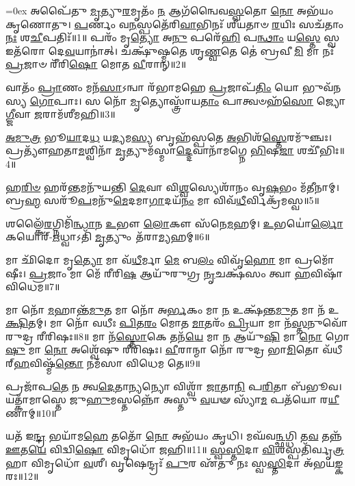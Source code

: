 \let\oldparskip\parskip
\parskip=0ex
𑌅𑌪𑍈᳴𑌤𑍁 \ul{𑌮𑍃}\-𑌤𑍍𑌯𑍁\-\ul{𑌰}\-𑌮𑍃𑌤𑌂᳴ \ul{𑌨} 𑌆𑌗᳴𑌨𑍍𑌵𑍈𑌵\-\ul{𑌸𑍍𑌵}\-𑌤𑍋 \ul{𑌨𑍋} 𑌅𑌭᳴𑌯𑌂 𑌕𑍃𑌣𑍋𑌤𑍁।
\-\ul{𑌪}\-𑌰𑍍𑌣𑌂 𑌵\-\ul{𑌨}\-𑌸𑍍𑌪𑌤𑍇᳴𑌰𑌿\-\ul{𑌵𑌾}\-𑌭𑌿𑌨𑌃᳴ 𑌶𑍀𑌯𑌤𑌾𑍞 \ul{𑌰}\-𑌯𑌿𑌃 𑌸𑌚᳴𑌤𑌾𑌂 \ul{𑌨𑌃} 𑌶\-\ul{𑌚𑍀}\-𑌪𑌤𑌿𑌃᳴॥1॥
𑌪𑌰𑌂᳴ 𑌮𑍃\-\ul{𑌤𑍍𑌯𑍋} 𑌅\-\ul{𑌨𑍁} 𑌪𑌰𑍇᳴\-\ul{𑌹𑌿} 𑌪\-\ul{𑌨𑍍𑌥𑌾𑌂} 𑌯\-\ul{𑌸𑍍𑌤𑍇} 𑌸𑍍𑌵 𑌇𑌤᳴𑌰𑍋 𑌦𑍇\-\ul{𑌵}\-𑌯𑌾𑌨𑌾॑𑌤𑍍।
𑌚𑌕𑍍𑌷𑍁᳴𑌷𑍍𑌮𑌤𑍇 𑌶𑍃\-\ul{𑌣𑍍𑌵}\-𑌤𑍇 𑌤𑍇॑ 𑌬𑍍𑌰𑌵𑍀\-\ul{𑌮𑌿} 𑌮𑌾 𑌨𑌃᳴ \ul{𑌪𑍍𑌰}\-𑌜𑌾𑍞 𑌰𑍀᳴𑌰𑌿\-\ul{𑌷𑍋} 𑌮𑍋𑌤 \ul{𑌵𑍀}\-𑌰𑌾𑌨𑍍॥2॥

𑌵𑌾𑌤𑌂᳴ \ul{𑌪𑍍𑌰𑌾}\-𑌣𑌂 𑌮𑌨᳴\-\ul{𑌸𑌾}\-𑌽𑌨𑍍𑌵𑌾 𑌰᳴𑌭𑌾𑌮𑌹𑍇 \ul{𑌪𑍍𑌰}\-𑌜𑌾𑌪᳴\-\ul{𑌤𑌿𑌂} 𑌯𑍋 𑌭𑍁𑌵᳴𑌨𑌸𑍍𑌯 \ul{𑌗𑍋}\-𑌪𑌾𑌃।
𑌸 𑌨𑍋᳴ \ul{𑌮𑍃}\-𑌤𑍍𑌯𑍋𑌸𑍍𑌤𑍍𑌰𑌾᳴𑌯\-\ul{𑌤𑌾𑌂} 𑌪𑌾𑌤𑍍𑌵𑍞𑌹᳴\-\ul{𑌸𑍋} 𑌜𑍍𑌯𑍋\-\ul{𑌗𑍍𑌜𑍀}\-𑌵𑌾 \ul{𑌜}\-𑌰𑌾𑌮᳴𑌶𑍀𑌮𑌹𑌿॥3॥

\-\ul{𑌅}\-\-\ul{𑌮𑍁}\-\-\ul{𑌤𑍍𑌰} 𑌭𑍂\-\ul{𑌯𑌾}\-𑌦\-\ul{𑌧} 𑌯\-\ul{𑌦𑍍𑌯}\-𑌮\-\ul{𑌸𑍍𑌯} 𑌬𑍃𑌹᳴𑌸𑍍𑌪𑌤𑍇 \ul{𑌅}\-𑌭𑌿𑌶᳴\-\ul{𑌸𑍍𑌤𑍇}\-𑌰𑌮𑍁᳴𑌞𑍍𑌚𑌃।
𑌪𑍍𑌰𑌤𑍍𑌯𑍗᳴𑌹𑌤𑌾\-\ul{𑌮}\-𑌶𑍍𑌵𑌿𑌨𑌾᳴ \ul{𑌮𑍃}\-𑌤𑍍𑌯𑍁𑌮᳴𑌸𑍍𑌮𑌾\-\ul{𑌦𑍍𑌦𑍇}\-𑌵𑌾𑌨𑌾᳴𑌮𑌗𑍍𑌨𑍇 \ul{𑌭𑌿}\-𑌷\-\ul{𑌜𑌾} 𑌶𑌚𑍀᳴𑌭𑌿𑌃॥4॥

𑌹\-\ul{𑌰𑌿}\-\-\ul{𑍞} 𑌹𑌰᳴\-\ul{𑌨𑍍𑌤}\-𑌮𑌨𑍁᳴𑌯𑌨𑍍𑌤𑌿 \ul{𑌦𑍇}\-𑌵𑌾 𑌵𑌿\-\ul{𑌶𑍍𑌵}\-𑌸𑍍𑌯𑍇𑌶𑌾᳴𑌨𑌂 𑌵𑍃\-\ul{𑌷}\-𑌭𑌂 𑌮᳴\-\ul{𑌤𑍀}\-𑌨𑌾𑌮𑍍।
𑌬𑍍𑌰\-\ul{𑌹𑍍𑌮} 𑌸𑌰𑍂᳴\-\ul{𑌪}\-𑌮𑌨𑍁᳴\-\ul{𑌮𑍇}\-𑌦𑌮𑌾\-\ul{𑌗𑌾}\-𑌦𑌯᳴\-\ul{𑌨𑌂} 𑌮𑌾 𑌵𑌿𑌵᳴\-\ul{𑌧𑍀}\-𑌰𑍍𑌵𑌿𑌕𑍍𑌰᳴𑌮𑌸𑍍𑌵॥5॥

𑌶𑌲𑍍𑌕𑍈᳴\-\ul{𑌰}\-𑌗𑍍𑌨𑌿𑌮𑌿᳴\-\ul{𑌨𑍍𑌧𑌾}\-𑌨 \ul{𑌉}\-𑌭𑍗 \ul{𑌲𑍋}\-𑌕𑍗 𑌸᳴𑌨𑍇\-\ul{𑌮}\-𑌹𑌮𑍍।
\-\ul{𑌉}\-𑌭𑌯𑍋॑\-\ul{𑌰𑍍𑌲𑍋}\-𑌕𑌯𑍋𑌰𑍍᳴-\-\ul{𑌋}\-𑌧𑍍𑌵𑌾𑌽𑌤𑌿᳴ \ul{𑌮𑍃}\-𑌤𑍍𑌯𑍁𑌂 𑌤᳴𑌰𑌾\-\ul{𑌮𑍍𑌯}\-𑌹𑌮𑍍॥6॥

𑌮𑌾 𑌛𑌿᳴𑌦𑍋 𑌮𑍃\-\ul{𑌤𑍍𑌯𑍋} 𑌮𑌾 𑌵᳴\-\ul{𑌧𑍀}\-𑌰𑍍𑌮𑌾 \ul{𑌮𑍇} 𑌬\-\ul{𑌲𑌂} 𑌵𑌿𑌵𑍃᳴\-\ul{𑌹𑍋} 𑌮𑌾 𑌪𑍍𑌰𑌮𑍋᳴𑌷𑍀𑌃।
\-\ul{𑌪𑍍𑌰}\-𑌜𑌾𑌂 𑌮𑌾 𑌮𑍇᳴ 𑌰𑍀𑌰𑌿\-\ul{𑌷} 𑌆𑌯𑍁᳴𑌰𑍁𑌗𑍍𑌰 \ul{𑌨𑍃}\-𑌚𑌕𑍍𑌷᳴𑌸𑌂 𑌤𑍍𑌵𑌾 \ul{𑌹}\-𑌵𑌿𑌷𑌾᳴ 𑌵𑌿𑌧𑍇𑌮॥7॥

𑌮𑌾 𑌨𑍋᳴ \ul{𑌮}\-𑌹𑌾𑌨𑍍𑌤᳴\-\ul{𑌮𑍁}\-𑌤 𑌮𑌾 𑌨𑍋᳴ 𑌅\-\ul{𑌰𑍍𑌭}\-𑌕𑌂 𑌮𑌾 \ul{𑌨} 𑌉𑌕𑍍𑌷᳴𑌨𑍍𑌤\-\ul{𑌮𑍁}\-𑌤 𑌮𑌾 𑌨᳴ 𑌉\-\ul{𑌕𑍍𑌷𑌿}\-𑌤𑌮𑍍।
 𑌮𑌾 𑌨𑍋᳴ 𑌵𑌧𑍀𑌃 \ul{𑌪𑌿}\-𑌤\-\ul{𑌰𑌂} 𑌮𑍋𑌤 \ul{𑌮𑌾}\-𑌤𑌰𑌂᳴ \ul{𑌪𑍍𑌰𑌿}\-𑌯𑌾 𑌮𑌾 𑌨᳴\-\ul{𑌸𑍍𑌤}\-𑌨𑍁𑌵𑍋᳴ 𑌰𑍁𑌦𑍍𑌰 𑌰𑍀𑌰𑌿𑌷𑌃॥8॥
 𑌮𑌾 𑌨᳴\-\ul{𑌸𑍍𑌤𑍋}\-𑌕𑍇 𑌤𑌨᳴\-\ul{𑌯𑍇} 𑌮𑌾 \ul{𑌨} 𑌆𑌯𑍁᳴\-\ul{𑌷𑌿} 𑌮𑌾 \ul{𑌨𑍋} 𑌗𑍋\-\ul{𑌷𑍁} 𑌮𑌾 \ul{𑌨𑍋} 𑌅𑌶𑍍𑌵𑍇᳴𑌷𑍁 𑌰𑍀𑌰𑌿𑌷𑌃।
 \ul{𑌵𑍀}\-𑌰𑌾𑌨𑍍𑌮𑌾 𑌨𑍋᳴ 𑌰𑍁𑌦𑍍𑌰 𑌭𑌾\-\ul{𑌮𑌿}\-𑌤𑍋 𑌵᳴𑌧𑍀𑌰𑍍‌\-\ul{𑌹}\-𑌵𑌿𑌷𑍍𑌮᳴\-\ul{𑌨𑍍𑌤𑍋} 𑌨𑌮᳴𑌸𑌾 𑌵𑌿𑌧𑍇𑌮 𑌤𑍇॥9॥

𑌪𑍍𑌰𑌜𑌾᳴𑌪\-\ul{𑌤𑍇} 𑌨 𑌤𑍍𑌵\-\ul{𑌦𑍇}\-𑌤𑌾\-\ul{𑌨𑍍𑌯}\-𑌨𑍍𑌯𑍋 𑌵𑌿𑌶𑍍𑌵𑌾᳴ \ul{𑌜𑌾}\-𑌤𑌾\-\ul{𑌨𑌿} 𑌪\-\ul{𑌰𑌿}\-𑌤𑌾 𑌬᳴𑌭𑍂𑌵।
𑌯𑌤𑍍𑌕𑌾᳴𑌮𑌾𑌸𑍍𑌤𑍇 𑌜𑍁\-\ul{𑌹𑍁}\-𑌮𑌸𑍍𑌤𑌨𑍍𑌨𑍋᳴ 𑌅𑌸𑍍𑌤𑍁 \ul{𑌵}\-𑌯𑍟 𑌸𑍍𑌯𑌾᳴\-\ul{𑌮} 𑌪𑌤᳴𑌯𑍋 𑌰\-\ul{𑌯𑍀}\-𑌣𑌾𑌮𑍍॥10॥

𑌯𑌤᳴ 𑌇\-\ul{𑌨𑍍𑌦𑍍𑌰} 𑌭𑌯𑌾᳴𑌮\-\ul{𑌹𑍇} 𑌤𑌤𑍋᳴ \ul{𑌨𑍋} 𑌅𑌭᳴𑌯𑌂 𑌕𑍃𑌧𑌿।
𑌮𑌘᳴𑌵\-\ul{𑌨𑍍𑌛}\-𑌗𑍍𑌧𑌿 𑌤\-\ul{𑌵} 𑌤𑌨𑍍𑌨᳴ \ul{𑌊}\-𑌤\-\ul{𑌯𑍇} 𑌵𑌿𑌦𑍍𑌵𑌿\-\ul{𑌷𑍋} 𑌵𑌿𑌮𑍃𑌧𑍋᳴ 𑌜𑌹𑌿॥11॥
\-\ul{𑌸𑍍𑌵}\-\-\ul{𑌸𑍍𑌤𑌿}\-𑌦𑌾 \ul{𑌵𑌿}\-𑌶𑌸𑍍𑌪𑌤𑌿᳴𑌰𑍍𑌵𑍃\-\ul{𑌤𑍍𑌰}\-𑌹𑌾 𑌵𑌿𑌮𑍃𑌧𑍋᳴ \ul{𑌵}\-𑌶𑍀।
𑌵𑍃𑌷𑍇𑌨𑍍𑌦𑍍𑌰𑌃᳴ \ul{𑌪𑍁}\-𑌰 𑌏᳴𑌤𑍁 𑌨𑌃 𑌸𑍍𑌵\-\ul{𑌸𑍍𑌤𑌿}\-𑌦𑌾 𑌅᳴𑌭𑌯\-\ul{𑌙𑍍𑌕}\-𑌰𑌃॥12॥

